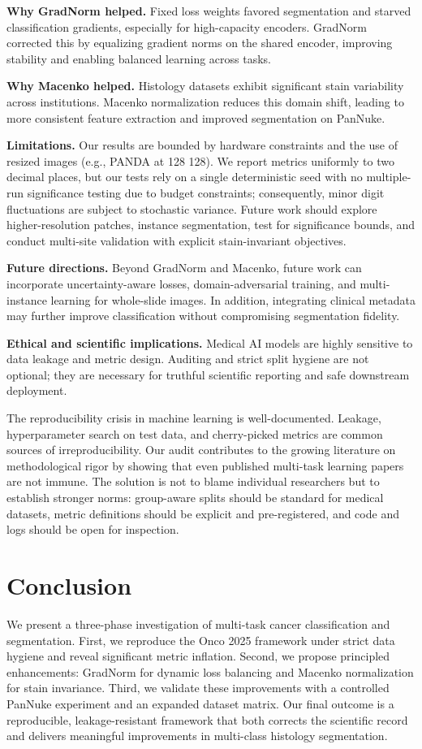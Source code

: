 \documentclass[conference,a4paper]{IEEEtran}
\begin{document}
\textbf{Why GradNorm helped.} Fixed loss weights favored segmentation and starved classification gradients, especially for high-capacity encoders. GradNorm corrected this by equalizing gradient norms on the shared encoder, improving stability and enabling balanced learning across tasks.

\textbf{Why Macenko helped.} Histology datasets exhibit significant stain variability across institutions. Macenko normalization reduces this domain shift, leading to more consistent feature extraction and improved segmentation on PanNuke.

\textbf{Limitations.} Our results are bounded by hardware constraints and the use of resized images (e.g., PANDA at 128\,\texttimes\,128). We report metrics uniformly to two decimal places, but our tests rely on a single deterministic seed with no multiple-run significance testing due to budget constraints; consequently, minor digit fluctuations are subject to stochastic variance. Future work should explore higher-resolution patches, instance segmentation, test for significance bounds, and conduct multi-site validation with explicit stain-invariant objectives.

\textbf{Future directions.} Beyond GradNorm and Macenko, future work can incorporate uncertainty-aware losses, domain-adversarial training, and multi-instance learning for whole-slide images. In addition, integrating clinical metadata may further improve classification without compromising segmentation fidelity.

\textbf{Ethical and scientific implications.} Medical AI models are highly sensitive to data leakage and metric design. Auditing and strict split hygiene are not optional; they are necessary for truthful scientific reporting and safe downstream deployment.
\par
The reproducibility crisis in machine learning is well-documented. Leakage, hyperparameter search on test data, and cherry-picked metrics are common sources of irreproducibility. Our audit contributes to the growing literature on methodological rigor by showing that even published multi-task learning papers are not immune. The solution is not to blame individual researchers but to establish stronger norms: group-aware splits should be standard for medical datasets, metric definitions should be explicit and pre-registered, and code and logs should be open for inspection.

\section{Conclusion}
We present a three-phase investigation of multi-task cancer classification and segmentation. First, we reproduce the Onco 2025 framework under strict data hygiene and reveal significant metric inflation. Second, we propose principled enhancements: GradNorm for dynamic loss balancing and Macenko normalization for stain invariance. Third, we validate these improvements with a controlled PanNuke experiment and an expanded dataset matrix. Our final outcome is a reproducible, leakage-resistant framework that both corrects the scientific record and delivers meaningful improvements in multi-class histology segmentation.
\end{document}
